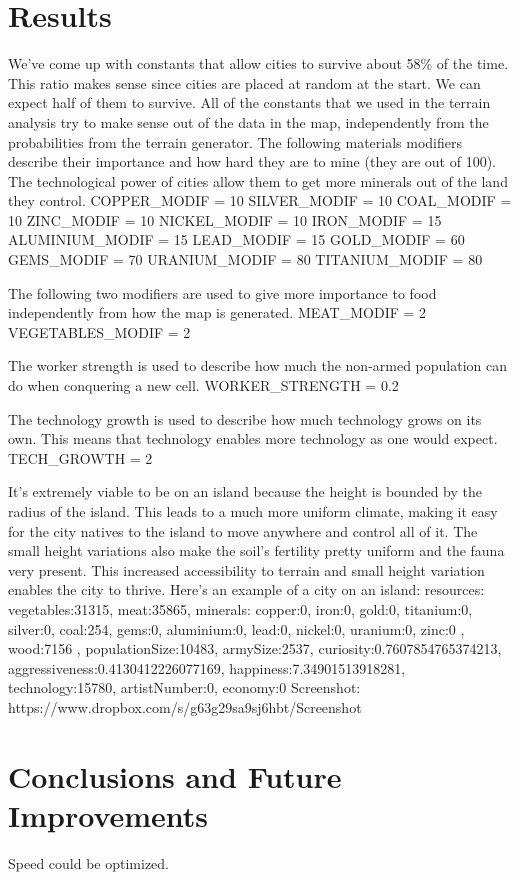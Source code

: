 \section{Results}
We've come up with constants that allow cities to survive about 58\% of the time. This ratio makes sense since cities are placed at random at the start. We can expect half of them to survive.
All of the constants that we used in the terrain analysis try to make sense out of the data in the map, independently from the probabilities from the terrain generator.
The following materials modifiers describe their importance and how hard they are to mine (they are out of 100). The technological power of cities allow them to get more minerals out of the land they control.
COPPER_MODIF = 10
SILVER_MODIF = 10
COAL_MODIF = 10
ZINC_MODIF = 10
NICKEL_MODIF = 10
IRON_MODIF = 15
ALUMINIUM_MODIF = 15
LEAD_MODIF = 15
GOLD_MODIF = 60
GEMS_MODIF = 70
URANIUM_MODIF = 80
TITANIUM_MODIF = 80

The following two modifiers are used to give more importance to food independently from how the map is generated.
MEAT_MODIF = 2
VEGETABLES_MODIF = 2

The worker strength is used to describe how much the non-armed population can do when conquering a new cell.
WORKER_STRENGTH = 0.2

The technology growth is used to describe how much technology grows on its own. This means that technology enables more technology as one would expect.
TECH_GROWTH = 2


It's extremely viable to be on an island because the height is bounded by the radius of the island. This leads to a much more uniform climate, making it easy for the city natives to the island to move anywhere and control all of it. The small height variations also make the soil's fertility pretty uniform and the fauna very present. This increased accessibility to terrain and small height variation enables the city to thrive.
Here's an example of a city on an island:
{
  resources:{
    vegetables:31315,
    meat:35865,
    minerals:{
      copper:0,
      iron:0,
      gold:0,
      titanium:0,
      silver:0,
      coal:254,
      gems:0,
      aluminium:0,
      lead:0,
      nickel:0,
      uranium:0,
      zinc:0
    },
    wood:7156
  },
  populationSize:10483,
  armySize:2537,
  curiosity:0.7607854765374213,
  aggressiveness:0.4130412226077169,
  happiness:7.34901513918281,
  technology:15780,
  artistNumber:0,
  economy:0
}
Screenshot: https://www.dropbox.com/s/g63g29sa9sj6hbt/Screenshot%


\section{Conclusions and Future Improvements}

Speed could be optimized.



